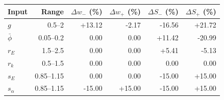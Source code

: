 \begin{tabularx}{\linewidth}{Xrrrrr}
\toprule
Input & Range & $\Delta w_-$ (\%) & $\Delta w_+$ (\%) & $\Delta S_-$ (\%) & $\Delta S_+$ (\%) \\
\midrule
$g$ & 0.5--2 & +13.12 & -2.17 & -16.56 & +21.72 \\
$\bar\phi$ & 0.05--0.2 & 0.00 & 0.00 & +11.42 & -20.99 \\
$r_E$ & 1.5--2.5 & 0.00 & 0.00 & +5.41 & -5.13 \\
$r_k$ & 0.5--1.5 & 0.00 & 0.00 & 0.00 & 0.00 \\
$s_E$ & 0.85--1.15 & 0.00 & 0.00 & -15.00 & +15.00 \\
$s_\alpha$ & 0.85--1.15 & -15.00 & +15.00 & -15.00 & +15.00 \\
\bottomrule
\end{tabularx}

